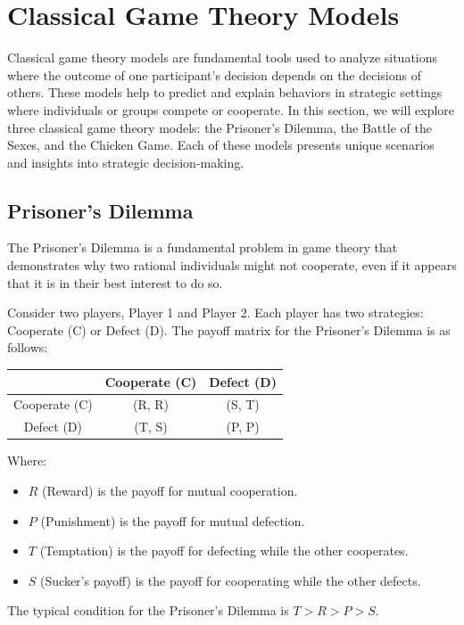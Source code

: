 \documentclass[12pt]{book} %
\begin{document}
\section{Classical Game Theory Models}
Classical game theory models are fundamental tools used to analyze situations where the outcome of one participant's decision depends on the decisions of others. These models help to predict and explain behaviors in strategic settings where individuals or groups compete or cooperate. In this section, we will explore three classical game theory models: the Prisoner's Dilemma, the Battle of the Sexes, and the Chicken Game. Each of these models presents unique scenarios and insights into strategic decision-making.

\subsection{Prisoner's Dilemma}
The Prisoner's Dilemma is a fundamental problem in game theory that demonstrates why two rational individuals might not cooperate, even if it appears that it is in their best interest to do so.

Consider two players, Player 1 and Player 2. Each player has two strategies: Cooperate (C) or Defect (D). The payoff matrix for the Prisoner's Dilemma is as follows:

\begin{center}
\begin{tabular}{c|c|c}
 & Cooperate (C) & Defect (D) \\ \hline
Cooperate (C) & (R, R) & (S, T) \\ \hline
Defect (D) & (T, S) & (P, P) \\
\end{tabular}
\end{center}

Where:
\begin{itemize}
    \item $R$ (Reward) is the payoff for mutual cooperation.
    \item $P$ (Punishment) is the payoff for mutual defection.
    \item $T$ (Temptation) is the payoff for defecting while the other cooperates.
    \item $S$ (Sucker's payoff) is the payoff for cooperating while the other defects.
\end{itemize}

The typical condition for the Prisoner's Dilemma is $T > R > P > S$.
\end{document}

